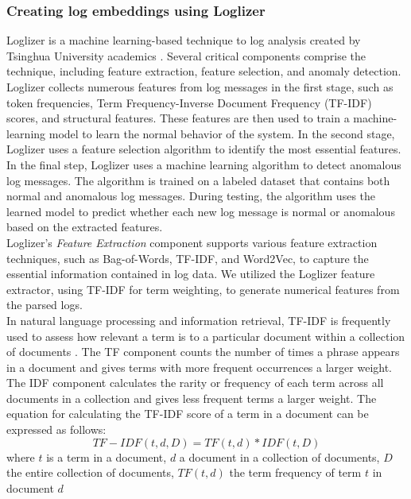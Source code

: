       \subsubsection{Creating log embeddings using Loglizer}
        \label{subsub:Loglizer}
        Loglizer is a machine learning-based technique to log analysis created by Tsinghua University academics \cite{Loglizer}. 
        Several critical components comprise the technique, including feature extraction, feature selection, and anomaly detection.
        Loglizer collects numerous features from log messages in the first stage, such as token frequencies, Term Frequency-Inverse Document Frequency (TF-IDF) scores, 
        and structural features. 
        These features are then used to train a machine-learning model to learn the normal behavior of the system.
        In the second stage, Loglizer uses a feature selection algorithm to identify the most essential features.
        In the final step, Loglizer uses a machine learning algorithm to detect anomalous log messages. 
        The algorithm is trained on a labeled dataset that contains both normal and anomalous log messages. 
        During testing, the algorithm uses the learned model to predict whether each new log message is normal or anomalous based on the extracted features.\\
        Loglizer's \emph{Feature Extraction} component supports various feature extraction techniques, such as Bag-of-Words, TF-IDF, and Word2Vec, 
        to capture the essential information contained in log data. We utilized the Loglizer feature extractor, using TF-IDF \cite{TF-IDF} for term weighting, to generate numerical 
        features from the parsed logs.\\
        In natural language processing and information retrieval, TF-IDF is frequently used to assess how relevant a term is to a particular document within a collection 
        of documents \cite{tf-idf_review}. The TF component counts the number of times a phrase appears in a document and gives terms with more frequent occurrences a larger weight. 
        The IDF component calculates the rarity or frequency of each term across all documents in a collection and gives less frequent terms a larger weight.
        The equation for calculating the TF-IDF score of a term in a document can be expressed as follows:
        \begin{equation}
          TF-IDF(t,d,D) = TF(t,d) * IDF(t,D)
        \end{equation}
        where $t$ is a term in a document, $d$ a document in a collection of documents, $D$ the entire collection of documents, $TF(t,d)$ the term frequency of term $t$ in document $d$
